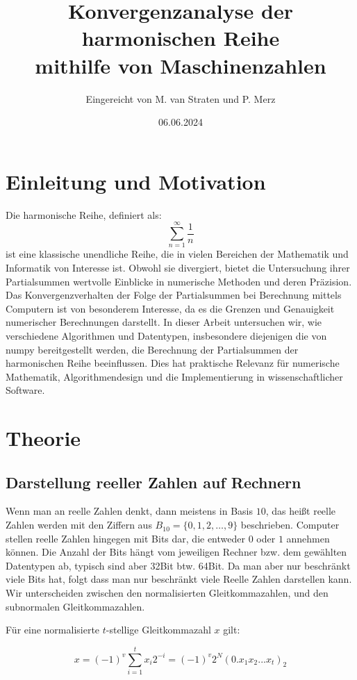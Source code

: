 \documentclass{scrartcl}
\title{Konvergenzanalyse der harmonischen Reihe\\
mithilfe von Maschinenzahlen}
\author{
  Eingereicht von M. van Straten und P. Merz
}
\date{06.06.2024}
\begin{document}
\maketitle
\cleardoublepage{}
\tableofcontents
\cleardoublepage{}


\section{Einleitung und Motivation}
Die harmonische Reihe, definiert als: \[ \sum_{n=1}^{\infty} \frac{1}{n} \] ist
eine klassische unendliche Reihe, die in vielen Bereichen der Mathematik und
Informatik von Interesse ist.
Obwohl sie divergiert, bietet die Untersuchung ihrer Partialsummen wertvolle
Einblicke in numerische Methoden und deren Präzision.
Das Konvergenzverhalten der Folge der Partialsummen bei Berechnung mittels
Computern ist von besonderem Interesse, da es die Grenzen und Genauigkeit
numerischer Berechnungen darstellt.
In dieser Arbeit untersuchen wir, wie verschiedene Algorithmen und Datentypen,
insbesondere diejenigen die von numpy bereitgestellt werden, die Berechnung der
Partialsummen der harmonischen Reihe beeinflussen.
Dies hat praktische Relevanz für numerische Mathematik, Algorithmendesign und
die Implementierung in wissenschaftlicher Software.                                             %

\section{Theorie}
\subsection{Darstellung reeller Zahlen auf Rechnern}
Wenn man an reelle Zahlen denkt, dann meistens in Basis \(10\), das heißt reelle Zahlen werden mit den Ziffern aus
\(B_{10} = \{0, 1, 2, \dots, 9\} \) beschrieben. 
Computer stellen reelle Zahlen hingegen mit Bits dar, die entweder \(0\) oder \(1\) annehmen können.                            
Die Anzahl der Bits hängt vom jeweiligen Rechner bzw. dem gewählten Datentypen ab, typisch sind aber 32Bit btw. 64Bit.
Da man aber nur beschränkt viele Bits hat, folgt dass man nur beschränkt viele Reelle Zahlen darstellen kann.
Wir unterscheiden zwischen den normalisierten Gleitkommazahlen, und den subnormalen Gleitkommazahlen.
\begin{flushleft}
Für eine normalisierte \(t\)-stellige Gleitkommazahl \(x\) gilt:
\end{flushleft} 
\[ x = (-1)^{v}\sum_{i=1}^{t} x_i 2^{-i} = (-1)^v 2^N (0.x_1x_2 ... x_t)_2 \]                              
\end{document}
